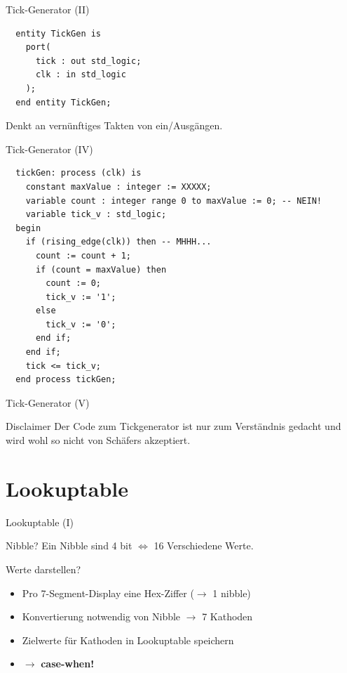   \begin{frame} [fragile] {Tick-Generator (II)}
    \begin{lstlisting}
  entity TickGen is
    port(
      tick : out std_logic;
      clk : in std_logic
    );
  end entity TickGen;
    \end{lstlisting}
    \begin{alertblock} {}
      Denkt an vernünftiges Takten von ein/Ausgängen.
    \end{alertblock}
  \end{frame}

  \begin{frame} [fragile] {Tick-Generator (IV)}
    \begin{lstlisting}
  tickGen: process (clk) is
    constant maxValue : integer := XXXXX;
    variable count : integer range 0 to maxValue := 0; -- NEIN!
    variable tick_v : std_logic;
  begin
    if (rising_edge(clk)) then -- MHHH...
      count := count + 1;
      if (count = maxValue) then
        count := 0;
        tick_v := '1';
      else
        tick_v := '0';
      end if;
    end if;
    tick <= tick_v;
  end process tickGen;
    \end{lstlisting}
  \end{frame}

  \begin{frame} {Tick-Generator (V)}
    \begin{alertblock} {Disclaimer}
      Der Code zum Tickgenerator ist nur zum Verständnis gedacht und wird wohl 
      so nicht von Schäfers akzeptiert.
    \end{alertblock}
  \end{frame}


  \section{Lookuptable}
  \begin{frame} {Lookuptable (I)}
    \begin{exampleblock} {Nibble?}
      Ein Nibble sind 4 bit $\Leftrightarrow$ 16 Verschiedene Werte.
    \end{exampleblock}

    \begin{block} {Werte darstellen?}
      \begin{itemize}
        \item Pro 7-Segment-Display eine Hex-Ziffer ($\rightarrow$ 1 nibble)
        \item Konvertierung notwendig von Nibble $\rightarrow$ 7 Kathoden
        \item Zielwerte für Kathoden in Lookuptable speichern
        \item $\rightarrow$ \textbf{case-when!}
      \end{itemize}
    \end{block}
  \end{frame}

